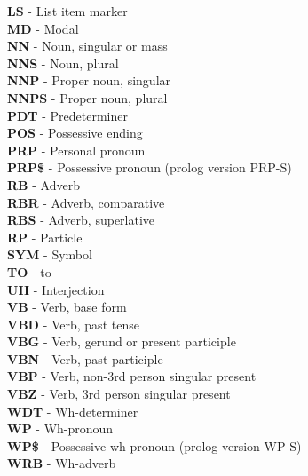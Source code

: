 \textbf{LS}   - List item marker\\


\textbf{MD}   - Modal\\


\textbf{NN}   - Noun, singular or mass\\


\textbf{NNS}  - Noun, plural\\


\textbf{NNP}  - Proper noun, singular\\


\textbf{NNPS} - Proper noun, plural\\


\textbf{PDT}  - Predeterminer\\


\textbf{POS}  - Possessive ending\\


\textbf{PRP}  - Personal pronoun\\


\textbf{PRP\$} - Possessive pronoun (prolog version PRP-S)\\


\textbf{RB}   - Adverb\\


\textbf{RBR}  - Adverb, comparative\\


\textbf{RBS}  - Adverb, superlative\\


\textbf{RP}   - Particle\\


\textbf{SYM}  - Symbol\\


\textbf{TO}   - to\\


\textbf{UH}   - Interjection\\


\textbf{VB}   - Verb, base form\\


\textbf{VBD}  - Verb, past tense\\


\textbf{VBG}  - Verb, gerund or present participle\\


\textbf{VBN}  - Verb, past participle\\


\textbf{VBP}  - Verb, non-3rd person singular present\\


\textbf{VBZ}  - Verb, 3rd person singular present\\


\textbf{WDT}  - Wh-determiner\\


\textbf{WP}   - Wh-pronoun\\


\textbf{WP\$}  - Possessive wh-pronoun (prolog version WP-S)\\


\textbf{WRB}  - Wh-adverb\\

